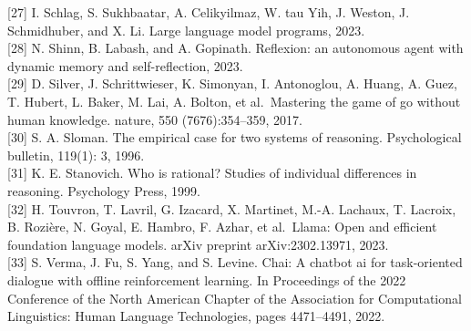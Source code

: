 \documentclass[
]{article}
\begin{document}
{[}27{]} I. Schlag, S. Sukhbaatar, A. Celikyilmaz, W. tau Yih, J.
Weston, J. Schmidhuber, and X. Li. Large language model programs,
2023.\\
{[}28{]} N. Shinn, B. Labash, and A. Gopinath. Reflexion: an autonomous
agent with dynamic memory and self-reflection, 2023.\\
{[}29{]} D. Silver, J. Schrittwieser, K. Simonyan, I. Antonoglou, A.
Huang, A. Guez, T. Hubert, L. Baker, M. Lai, A. Bolton, et al.~Mastering
the game of go without human knowledge. nature, 550 (7676):354--359,
2017.\\
{[}30{]} S. A. Sloman. The empirical case for two systems of reasoning.
Psychological bulletin, 119(1): 3, 1996.\\
{[}31{]} K. E. Stanovich. Who is rational? Studies of individual
differences in reasoning. Psychology Press, 1999.\\
{[}32{]} H. Touvron, T. Lavril, G. Izacard, X. Martinet, M.-A. Lachaux,
T. Lacroix, B. Rozière, N. Goyal, E. Hambro, F. Azhar, et al.~Llama:
Open and efficient foundation language models. arXiv preprint
arXiv:2302.13971, 2023.\\
{[}33{]} S. Verma, J. Fu, S. Yang, and S. Levine. Chai: A chatbot ai for
task-oriented dialogue with offline reinforcement learning. In
Proceedings of the 2022 Conference of the North American Chapter of the
Association for Computational Linguistics: Human Language Technologies,
pages 4471--4491, 2022.
\end{document}
